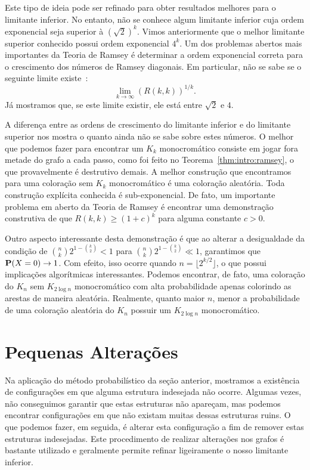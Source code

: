 Este tipo de ideia pode ser refinado para obter resultados melhores para o limitante inferior. No entanto, não se conhece algum limitante inferior cuja ordem exponencial seja superior à $(\sqrt{2})^k$. Vimos anteriormente que o melhor limitante superior conhecido possui ordem exponencial $4^k$. Um dos problemas abertos mais importantes da Teoria de Ramsey é determinar a ordem exponencial correta para o crescimento dos números de Ramsey diagonais. Em particular, não se sabe se o seguinte limite existe~\cite{chung1983survey}:
\[ \lim_{k \to \infty} \left(R(k,k)  \right)^{1/k}. \]
Já mostramos que, se este limite existir, ele está entre $\sqrt{2}$ e $4$.

A diferença entre as ordens de crescimento do limitante inferior e do limitante superior nos mostra o quanto ainda não se sabe sobre estes números. O melhor que podemos fazer para encontrar um $K_k$ monocromático consiste em jogar fora metade do grafo a cada passo, como foi feito no Teorema~\ref{thm:intro:ramsey}, o que provavelmente é destrutivo demais. A melhor construção que encontramos para uma coloração sem $K_k$ monocromático é uma coloração aleatória. Toda construção explícita conhecida é sub-exponencial. De fato, um importante problema em aberto da Teoria de Ramsey é encontrar uma demonstração construtiva de que $R(k,k) \geq (1+c)^k$ para alguma constante $c > 0$.

Outro aspecto interessante desta demonstração é que ao alterar a desigualdade da condição de $\binom{n}{k} 2^{1 - \binom{k}{2}} < 1$ para $\binom{n}{k} 2^{1 - \binom{k}{2}} \ll 1$, garantimos que $\operatorname{\mathbf{P}}(X = 0) \to 1$. Com efeito, isso ocorre quando $n = \lfloor 2^{k/2} \rfloor$, o que possui implicações algorítmicas interessantes. Podemos encontrar, de fato, uma coloração do $K_n$ sem $K_{2\log n}$ monocromático com alta probabilidade apenas colorindo as arestas de maneira aleatória. Realmente, quanto maior $n$, menor a probabilidade de uma coloração aleatória do $K_n$ possuir um $K_{2\log n}$ monocromático.


\section{Pequenas Alterações}

Na aplicação do método probabilístico da seção anterior, mostramos a existência de configurações em que alguma estrutura indesejada não ocorre. Algumas vezes, não conseguimos garantir que estas estruturas não apareçam, mas podemos encontrar configurações em que não existam muitas dessas estruturas ruins. O que podemos fazer, em seguida, é alterar esta configuração a fim de remover estas estruturas indesejadas. Este procedimento de realizar alterações nos grafos é bastante utilizado e geralmente permite refinar ligeiramente o nosso limitante inferior.

